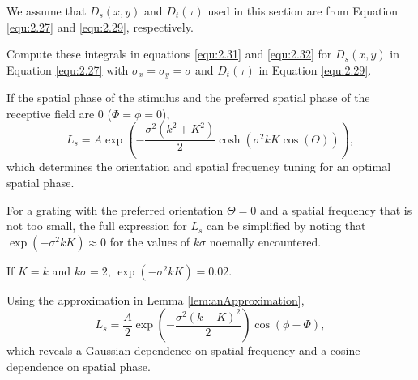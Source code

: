 \begin{asm}
  We assume that $D_s(x,y)$ and $D_t(\tau)$ used in this section are from Equation \ref{equ:2.27} and \ref{equ:2.29}, respectively.
\end{asm}

\begin{exc}
  Compute these integrals in equations \ref{equ:2.31} and \ref{equ:2.32} for $D_s(x,y)$ in Equation \ref{equ:2.27} with $\sigma_x = \sigma_y = \sigma$ and $D_t(\tau)$ in Equation \ref{equ:2.29}.
\end{exc}

\begin{prop}
  If the spatial phase of the stimulus and the preferred spatial phase of the receptive field are 0 ($\Phi = \phi = 0$),
  \begin{equation}
    \label{equ:2.33}
    L_s = A\exp\left(-\frac{\sigma^2(k^2+K^2)}{2}\cosh(\sigma^2kK\cos(\Theta))\right),
  \end{equation}
  which determines the orientation and spatial frequency tuning for an
optimal spatial phase.
\end{prop}

\begin{lem}
  \label{lem:anApproximation}
  For a grating with the preferred orientation $\Theta = 0$ and a spatial frequency that is not too small, the full expression for $L_s$ can be simplified by noting that $\exp(-\sigma^2kK) \approx 0$ for the values of $k\sigma$ noemally encountered.
\end{lem}

\begin{exm}
  If $K = k$ and $k\sigma = 2$, $\exp(-\sigma^2kK) = 0.02$.
\end{exm}

\begin{prop}
  Using the approximation in Lemma \ref{lem:anApproximation},
  \begin{equation}
    \label{equ:2.34}
    L_s = \frac{A}{2}\exp\left(-\frac{\sigma^2(k-K)^2}{2}\right)\cos(\phi-\Phi),
  \end{equation}
  which reveals a Gaussian dependence on spatial frequency and a cosine
dependence on spatial phase.
\end{prop}

